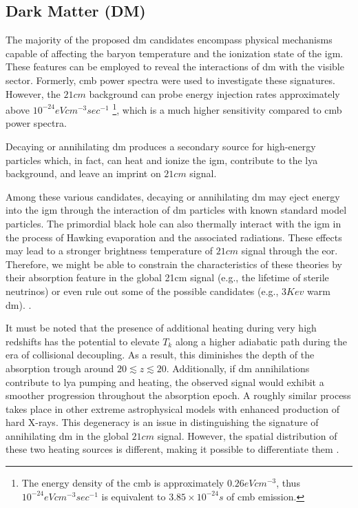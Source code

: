\documentclass[12pt, TexShade, letterpaper]{report}
\begin{document}
\subsection{Dark Matter (DM)}
The majority of the proposed \gls{dm} candidates encompass physical mechanisms capable of affecting the baryon temperature and the ionization state of the \gls{igm}. These features can be employed to reveal the interactions of \gls{dm} with the visible sector. Formerly, \gls{cmb} power spectra were used to investigate these signatures. However, the $21cm$ background can probe energy injection rates approximately above $10^{-24}eV cm^{-3} sec^{-1}$ \footnote{The energy density of the \gls{cmb} is approximately $0.26 eV cm^{-3}$, thus $10^{-24}eV cm^{-3} sec^{-1}$ is equivalent to $3.85 \times 10^{-24} s$ of \gls{cmb} emission.}, which is a much higher sensitivity compared to \gls{cmb} power spectra.\par
Decaying or annihilating \gls{dm} produces a secondary source for high-energy particles which, in fact, can heat and ionize the \gls{igm}, contribute to the \gls{lya} background, and leave an imprint on $21cm$ signal.\par
Among these various candidates, decaying or annihilating \gls{dm} may eject energy into the \gls{igm} through the interaction of \gls{dm} particles with known standard model particles. The primordial black hole can also thermally interact with the \gls{igm} in the process of Hawking evaporation and the associated radiations. These effects may lead to a stronger brightness temperature of $21cm$ signal through the \gls{eor}.  Therefore, we might be able to constrain the characteristics of these theories by their absorption feature in the global 21cm signal (e.g., the lifetime of sterile neutrinos) or even rule out some of the possible candidates (e.g., $3 Kev$ warm \gls{dm}). \cite{DM_anihilation_furlantto, constrain_dm_21, DM_anihilation_1, DM_ionize, dark_cosmology_21, snowmass_dm, rule_out, primordial_bh, new_physics_thesis, primordial_bh_binary, 21limit_dm_bh, bound_dm, sterile_neutrino}.\par

It must be noted that the presence of additional heating during very high redshifts has the potential to elevate $T_k$ along a higher adiabatic path during the era of collisional decoupling. As a result, this diminishes the depth of the absorption trough around $20 \lesssim z \lesssim 20$. Additionally, if \gls{dm} annihilations contribute to \gls{lya} pumping and heating, the observed signal would exhibit a smoother progression throughout the absorption epoch. A roughly similar process takes place in other extreme astrophysical models with enhanced production of hard X-rays. This degeneracy is an issue in distinguishing the signature of annihilating \gls{dm} in the global $21cm$ signal. However, the spatial distribution of these two heating sources is different, making it possible to differentiate them \cite{dark_nature_21}. \par
\end{document}
